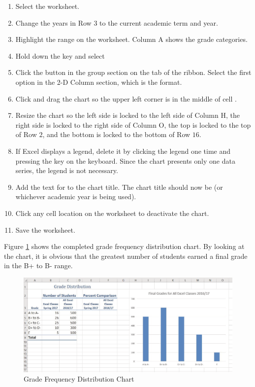 \begin{enumerate}
	\item Select the  worksheet.
	\item Change the years in Row $ 3 $ to the current academic term and year.
	\item Highlight the range  on the  worksheet. Column A shows the grade categories.
	\item Hold down the  key and select 
	\item Click the  button in the  group section on the  tab of the ribbon. Select the first option in the 2-D Column section, which is the  format.
	\item Click and drag the chart so the upper left corner is in the middle of cell .
	\item Resize the chart so the left side is locked to the left side of Column H, the right side is locked to the right side of Column O, the top is locked to the top of Row $ 2 $, and the bottom is locked to the bottom of Row $ 16 $.
	\item If Excel displays a legend, delete it by clicking the legend one time and pressing the  key on the keyboard. Since the chart presents only one data series, the legend is not necessary.
	\item Add the text  for to the chart title. The chart title should now be  (or whichever academic year is being used).
	\item Click any cell location on the  worksheet to deactivate the chart.
	\item Save the worksheet.
\end{enumerate}

Figure \ref{04:fig13} shows the completed grade frequency distribution chart. By looking at the chart, it is obvious that the greatest number of students earned a final grade in the B+ to B- range.

\begin{figure}[H]
	\centering
	\includegraphics[width=\maxwidth{.95\linewidth}]{gfx/ch04_fig13}
	\caption{Grade Frequency Distribution Chart}
	\label{04:fig13}
\end{figure}

